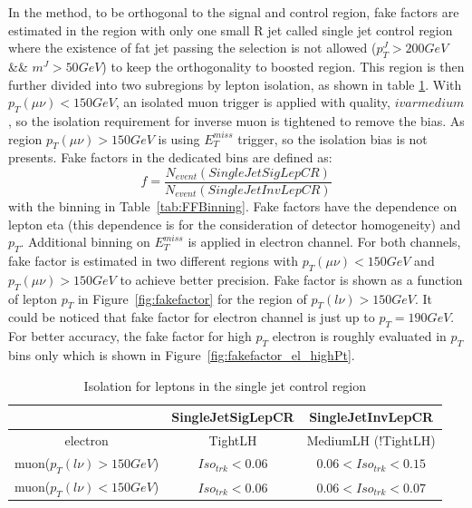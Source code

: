 In the method, to be orthogonal to the signal and control region, fake factors are estimated in the region with only one small R jet called single jet control region where the existence of fat jet passing the selection is not allowed ($p_{T}^{J}>200GeV$ \&\& $m^{J}>50GeV$) to keep the orthogonality to boosted region. This region is then further divided into two subregions by lepton isolation, as shown in table \ref{tab:LepIsoCR}. With $p_{T}(\mu\nu)<150 GeV$, an isolated muon trigger is applied with quality, $ivarmedium $, so the isolation requirement for inverse muon is tightened to remove the bias. As region $p_{T}(\mu\nu)>150 GeV$ is using $E_{T}^{miss}$ trigger, so the isolation bias is not presents. Fake factors in the dedicated bins are defined as:
\begin{equation}
 f = \frac{N_{event}(SingleJetSigLepCR)}{N_{event}(SingleJetInvLepCR)}
\end{equation}
with the binning in Table~\ref{tab:FFBinning}. Fake factors have the dependence on lepton eta (this dependence is for the consideration of detector homogeneity) and $p_{T}$. Additional binning on $E_{T}^{miss}$ is applied in electron channel. For both channels, fake factor is estimated in two different regions with $p_{T}(\mu\nu)<150 GeV$ and $p_{T}(\mu\nu)>150 GeV$ to achieve better precision. Fake factor is shown as a function of lepton $p_{T}$ in Figure~\ref{fig:fakefactor} for the region of $p_{T}(l\nu)>150 GeV$. It could be noticed that fake factor for electron channel is just up to $p_{T}=190GeV$. For better accuracy, the fake factor for high $p_{T}$ electron is roughly evaluated in $p_{T}$ bins only which is shown in Figure~\ref{fig:fakefactor_el_highPt}.

\begin{table}[h]
  \caption{Isolation for leptons in the single jet control region} \label{tab:LepIsoCR}
  \begin{center}

    \begin{tabular}{ | c | c | c | }
     \hline
                               &   SingleJetSigLepCR   & SingleJetInvLepCR \\ \hline
    electron                   &        TightLH        & MediumLH (!TightLH) \\ \hline
    muon($p_{T}(l\nu)>150 GeV$) &  $Iso_{trk}<0.06$    & $0.06<Iso_{trk}<0.15$ \\ \hline
    muon($p_{T}(l\nu)<150 GeV$) &  $Iso_{trk}<0.06$    & $0.06<Iso_{trk}<0.07$ \\ \hline
\end{tabular}
\end{center}
\end{table}


